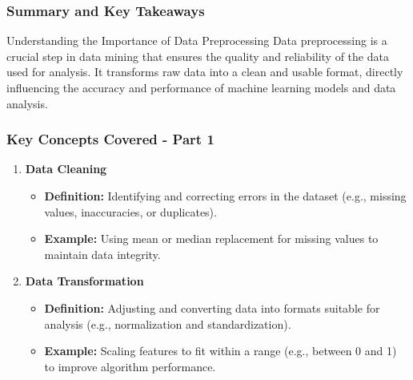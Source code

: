\documentclass[aspectratio=169]{beamer}
\begin{document}
\begin{frame}[fragile]
    \frametitle{Summary and Key Takeaways}
    \begin{block}{Understanding the Importance of Data Preprocessing}
        Data preprocessing is a crucial step in data mining that ensures the quality and reliability of the data used for analysis. It transforms raw data into a clean and usable format, directly influencing the accuracy and performance of machine learning models and data analysis.
    \end{block}
\end{frame}

\begin{frame}[fragile]
    \frametitle{Key Concepts Covered - Part 1}
    \begin{enumerate}
        \item \textbf{Data Cleaning}
        \begin{itemize}
            \item \textbf{Definition:} Identifying and correcting errors in the dataset (e.g., missing values, inaccuracies, or duplicates).
            \item \textbf{Example:} Using mean or median replacement for missing values to maintain data integrity.
        \end{itemize}

        \item \textbf{Data Transformation}
        \begin{itemize}
            \item \textbf{Definition:} Adjusting and converting data into formats suitable for analysis (e.g., normalization and standardization).
            \item \textbf{Example:} Scaling features to fit within a range (e.g., between 0 and 1) to improve algorithm performance.
        \end{itemize}
    \end{enumerate}
\end{frame}
\end{document}
